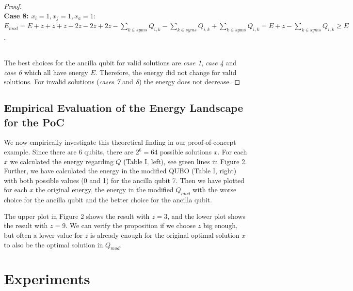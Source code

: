 \documentclass[conference]{IEEEtran}
\theoremstyle{plain}
\theoremstyle{definition}
\theoremstyle{remark}
\begin{document}
\begin{proof}
\ \\
\textbf{Case 8: $x_i = 1, x_j = 1, x_a = 1$}: $E_{mod} = E + z + z + z - 2z - 2z + 2z - \sum_{k \in syms} Q_{i,k} - \sum_{k \in syms} Q_{i,k} + \sum_{k \in syms} Q_{i,k} = E + z - \sum_{k \in syms} Q_{i,k} \geq E$.

\ \\
The best choices for the ancilla qubit for valid solutions are \textit{case 1}, \textit{case 4} and \textit{case 6} which all have energy $E$. Therefore, the energy did not change for valid solutions. For invalid solutions (\textit{cases 7} and \textit{8}) the energy does not decrease.

\end{proof}


\subsection{Empirical Evaluation of the Energy Landscape for the PoC}
We now empirically investigate this theoretical finding in our proof-of-concept example. Since there are $6$ qubits, there are $2^6=64$ possible solutions $x$. For each $x$ we calculated the energy regarding $Q$ (Table I, left), see green lines in Figure 2. Further, we have calculated the energy in the modified QUBO (Table I, right) with both possible values (0 and 1) for the ancilla qubit 7. Then we have plotted for each $x$ the original energy, the energy in the modified $Q_{mod}$ with the worse choice for the ancilla qubit and the better choice for the ancilla qubit.

The upper plot in Figure 2 shows the result with $z=3$, and the lower plot shows the result with $z=9$. We can verify the proposition if we choose $z$ big enough, but often a lower value for $z$ is already enough for the original optimal solution $x$ to also be the optimal solution in $Q_{mod}$.




\section{Experiments}
\end{document}
